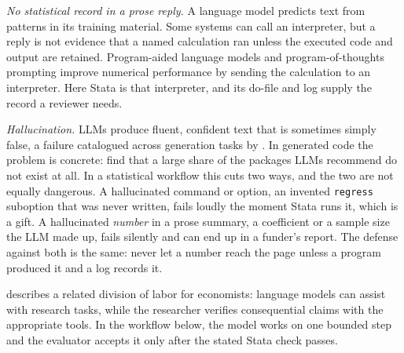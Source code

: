 \documentclass[
    a4paper,
    fontsize=10pt,
    twoside=true,
    numbers=noenddot,
]{kaobook}
\begin{document}
\emph{No statistical record in a prose reply.} A language model predicts text from patterns in its training material. Some systems can call an interpreter, but a reply is not evidence that a named calculation ran unless the executed code and output are retained. Program-aided language models \parencite{gao2023pal} and program-of-thoughts prompting \parencite{chen2023pot} improve numerical performance by sending the calculation to an interpreter. Here Stata is that interpreter, and its do-file and log supply the record a reviewer needs.

\emph{Hallucination.} LLMs produce fluent, confident text that is sometimes simply false, a failure catalogued across generation tasks by \textcite{ji2023survey}. In generated code the problem is concrete: \textcite{spracklen2025packages} find that a large share of the packages LLMs recommend do not exist at all. In a statistical workflow this cuts two ways, and the two are not equally dangerous. A hallucinated command or option, an invented \texttt{regress} suboption that was never written, fails loudly the moment Stata runs it, which is a gift. A hallucinated \emph{number} in a prose summary, a coefficient or a sample size the LLM made up, fails silently and can end up in a funder's report. The defense against both is the same: never let a number reach the page unless a program produced it and a log records it.

\textcite{korinek2023genai} describes a related division of labor for economists: language models can assist with research tasks, while the researcher verifies consequential claims with the appropriate tools. In the workflow below, the model works on one bounded step and the evaluator accepts it only after the stated Stata check passes.
\end{document}
